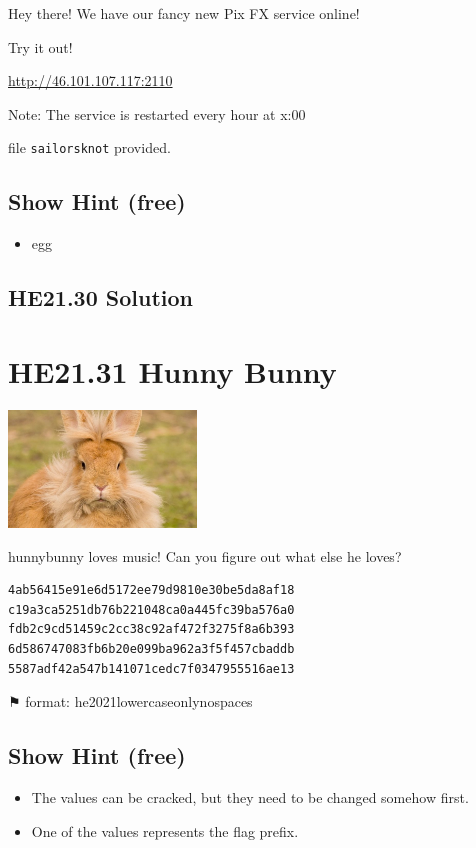 \documentclass[english,a4paper,nols,noindent]{tufte-handout}
\begin{document}
\noindent Hey there! We have our fancy new Pix FX service online!

\noindent Try it out!

\url{http://46.101.107.117:2110}

Note: The service is restarted every hour at x:00

file \verb+sailorsknot+ provided.

\subsection{Show Hint (free)}
\begin{itemize}
\item egg
\end{itemize}

\hypertarget{he21.30-solution}{%
\subsection{HE21.30 Solution}\label{he21.30-solution}}

\noindent 


\hypertarget{he21.31}{%
\section{HE21.31 Hunny Bunny}
  \label{he21.31}}
\begin{marginfigure}
    \includegraphics[width=50mm]{images/challenge31.jpg}
\end{marginfigure}

\noindent hunnybunny loves music! Can you figure out what else he loves?

\begin{verbatim}
4ab56415e91e6d5172ee79d9810e30be5da8af18
c19a3ca5251db76b221048ca0a445fc39ba576a0
fdb2c9cd51459c2cc38c92af472f3275f8a6b393
6d586747083fb6b20e099ba962a3f5f457cbaddb
5587adf42a547b141071cedc7f0347955516ae13
\end{verbatim}

⚑ format: he2021{lowercaseonlynospaces}

\subsection{Show Hint (free)}
\begin{itemize}
\item The values can be cracked, but they need to be changed somehow first.
\item One of the values represents the flag prefix.
\end{itemize}
\end{document}

